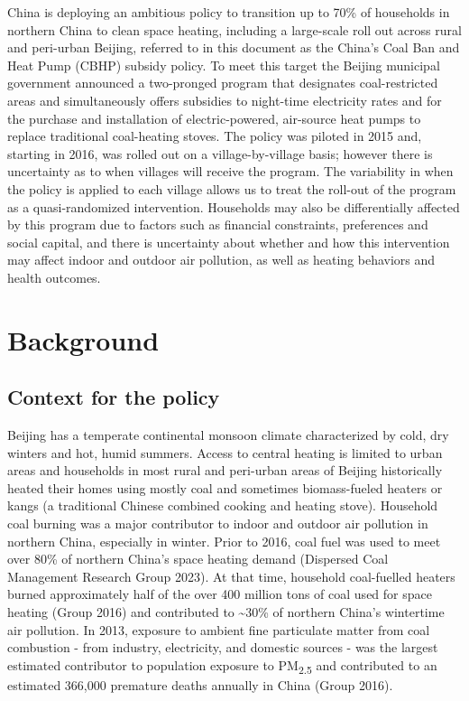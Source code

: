 \documentclass[
  letterpaper,
  DIV=11,
  numbers=noendperiod]{scrartcl}
\begin{document}
China is deploying an ambitious policy to transition up to 70\% of
households in northern China to clean space heating, including a
large-scale roll out across rural and peri-urban Beijing, referred to in
this document as the China's Coal Ban and Heat Pump (CBHP) subsidy
policy. To meet this target the Beijing municipal government announced a
two-pronged program that designates coal-restricted areas and
simultaneously offers subsidies to night-time electricity rates and for
the purchase and installation of electric-powered, air-source heat pumps
to replace traditional coal-heating stoves. The policy was piloted in
2015 and, starting in 2016, was rolled out on a village-by-village
basis; however there is uncertainty as to when villages will receive the
program. The variability in when the policy is applied to each village
allows us to treat the roll-out of the program as a quasi-randomized
intervention. Households may also be differentially affected by this
program due to factors such as financial constraints, preferences and
social capital, and there is uncertainty about whether and how this
intervention may affect indoor and outdoor air pollution, as well as
heating behaviors and health outcomes.

\hypertarget{background}{%
\section{Background}\label{background}}

\hypertarget{context-for-the-policy}{%
\subsection{Context for the policy}\label{context-for-the-policy}}

Beijing has a temperate continental monsoon climate characterized by
cold, dry winters and hot, humid summers. Access to central heating is
limited to urban areas and households in most rural and peri-urban areas
of Beijing historically heated their homes using mostly coal and
sometimes biomass-fueled heaters or kangs (a traditional Chinese
combined cooking and heating stove). Household coal burning was a major
contributor to indoor and outdoor air pollution in northern China,
especially in winter. Prior to 2016, coal fuel was used to meet over
80\% of northern China's space heating demand (Dispersed Coal Management
Research Group 2023). At that time, household coal-fuelled heaters
burned approximately half of the over 400 million tons of coal used for
space heating (Group 2016) and contributed to \textasciitilde30\% of
northern China's wintertime air pollution. In 2013, exposure to ambient
fine particulate matter from coal combustion - from industry,
electricity, and domestic sources - was the largest estimated
contributor to population exposure to PM\textsubscript{2.5} and
contributed to an estimated 366,000 premature deaths annually in China
(Group 2016).
\end{document}
